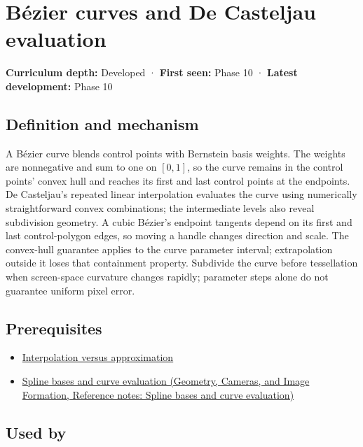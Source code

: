 \hypertarget{appendix-ddbec701898c}{}\label{referencestart:appendix-ddbec701898c}
\section{Bézier curves and De Casteljau evaluation}\label{appendix-ddbec701898c-buxe9zier-curves-and-de-casteljau-evaluation}

\textbf{Curriculum depth:} Developed · \textbf{First seen:} Phase 10 · \textbf{Latest development:} Phase 10

\subsection{Definition and mechanism}\label{appendix-ddbec701898c-definition-and-mechanism}

A Bézier curve blends control points with Bernstein basis weights. The weights are nonnegative and sum to one on \([0,1]\), so the curve remains in the control points' convex hull and reaches its first and last control points at the endpoints. De Casteljau's repeated linear interpolation evaluates the curve using numerically straightforward convex combinations; the intermediate levels also reveal subdivision geometry. A cubic Bézier's endpoint tangents depend on its first and last control-polygon edges, so moving a handle changes direction and scale. The convex-hull guarantee applies to the curve parameter interval; extrapolation outside it loses that containment property. Subdivide the curve before tessellation when screen-space curvature changes rapidly; parameter steps alone do not guarantee uniform pixel error.

\subsection{Prerequisites}\label{appendix-ddbec701898c-prerequisites}

\begin{itemize}
\tightlist
\item
  \hyperref[appendix-0c2a5f69851e]{Interpolation versus approximation}
\item
  \href{../03-Geometry-Cameras-and-Image-Formation/main.pdf\#nameddest=appendix-f28eeec97a3d}{Spline bases and curve evaluation (Geometry, Cameras, and Image Formation, Reference notes: Spline bases and curve evaluation)}
\end{itemize}

\subsection{Used by}\label{appendix-ddbec701898c-used-by}

